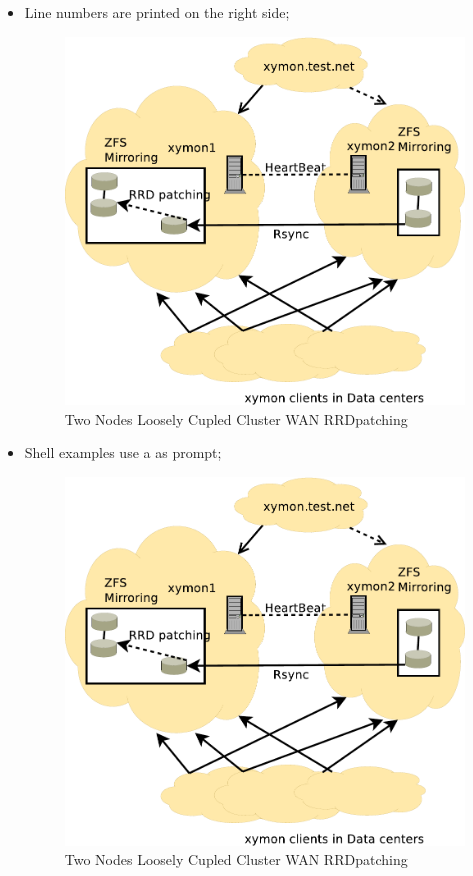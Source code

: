 \begin{itemize}
\item Line numbers are printed on the right side;
\begin{figure}[H]
\caption{Two Nodes Loosely Cupled Cluster WAN RRDpatching}
\label{fig:TwoNodeLooselyCpupledClusterWAN-RRDpatching5}
\begin{center}
\includegraphics[scale=0.65]{dia/TwoNodeLooselyCpupledClusterWAN-RRDpatching.pdf}
\end{center}
\end{figure}

\item Shell examples use a \pr{} as prompt;
\begin{figure}[H]
\caption{Two Nodes Loosely Cupled Cluster WAN RRDpatching}
\label{fig:TwoNodeLooselyCpupledClusterWAN-RRDpatching6}
\begin{center}
\includegraphics[scale=0.65]{dia/TwoNodeLooselyCpupledClusterWAN-RRDpatching.pdf}
\end{center}
\end{figure}


\end{itemize}
